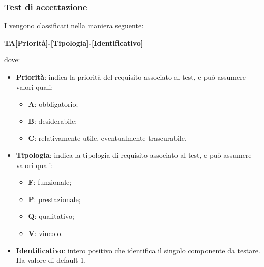 \documentclass[]{article}
\begin{document}
		\subsubsection{Test di accettazione}
		I  vengono classificati nella maniera seguente:
				\begin{center}
			\textbf{TA[Priorità]-[Tipologia]-[Identificativo]}
		\end{center}		 
		dove:\\
		\begin{itemize}
			\item \textbf{Priorità}: indica la priorità del requisito associato al test, e può assumere valori quali:
			\begin{itemize}
				\item \textbf{A}: obbligatorio;
				\item \textbf{B}: desiderabile;
				\item \textbf{C}: relativamente utile, eventualmente trascurabile.
			\end{itemize}
			\item \textbf{Tipologia}: indica la tipologia di requisito associato al test, e può assumere valori quali:
			\begin{itemize}
				\item \textbf{F}: funzionale;
				\item \textbf{P}: prestazionale;
				\item \textbf{Q}: qualitativo;
				\item \textbf{V}: vincolo.
			\end{itemize}
			\item \textbf{Identificativo}: intero positivo che identifica il singolo componente da testare. Ha valore di default 1.
		\end{itemize}				
						
		
\end{document}
